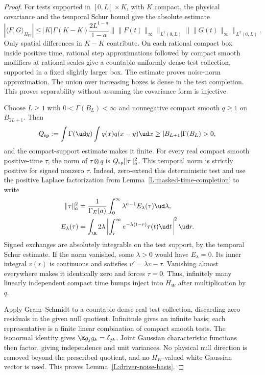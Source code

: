 \begin{proof}
  For tests supported in $[0,L]\times K$, with $K$ compact, the physical
  covariance and the temporal Schur bound give the absolute estimate
  \begin{equation}\label{E:driver-test-continuity}
    |\langle F,G\rangle_{H_W}|
    \le |K|\Gamma(K-K)\frac{2L^{1-a}}{1-a}
    \|\|F(t)\|_\infty\|_{L^2(0,L)}
    \|\|G(t)\|_\infty\|_{L^2(0,L)}.
  \end{equation}
  Only spatial differences in $K-K$ contribute. On each rational compact
  box inside positive time, rational step approximations followed by compact
  smooth mollifiers at rational scales give a countable uniformly dense
  test collection, supported in a fixed slightly larger box. The estimate
  proves noise-norm approximation. The union over increasing boxes is dense
  in the test completion. This proves separability without assuming the
  covariance form is injective.

  Choose $L\ge1$ with $0<\Gamma(B_L)<\infty$ and nonnegative compact
  smooth $q\ge1$ on $B_{2L+1}$. Then
  \[
    Q_{\rm sp}:=\int\Gamma(\ud y)\int q(x)q(x-y)\ud x
    \ge |B_{L+1}|\Gamma(B_L)>0,
  \]
  and the compact-support estimate makes it finite. For every real compact
  smooth positive-time $\tau$, the norm of $\tau\otimes q$ is
  $Q_{\rm sp}\|\tau\|_a^2$. This temporal norm is strictly positive for
  signed nonzero $\tau$. Indeed, zero-extend this deterministic test and
  use the positive Laplace factorization from
  Lemma~\ref{L:masked-time-completion} to write
  \begin{align*}
    \|\tau\|_a^2
    &=\frac1{\Gamma_E(a)}\int_0^\infty\lambda^{a-1}
    E_\lambda(\tau)\ud\lambda,\\
    E_\lambda(\tau)
    &=\int_\R 2\lambda\left|\int_r^\infty
    e^{-\lambda(t-r)}\tau(t)\ud t\right|^2\ud r.
  \end{align*}
  Signed exchanges are absolutely integrable on the test support, by the
  temporal Schur estimate. If the norm vanished, some $\lambda>0$ would
  have $E_\lambda=0$. Its inner integral $v(r)$ is continuous and satisfies
  $v'=\lambda v-\tau$. Vanishing almost everywhere makes it identically
  zero and forces $\tau=0$. Thus, infinitely many linearly independent
  compact time bumps inject into $H_W$ after multiplication by $q$.

  Apply Gram--Schmidt to a countable dense real test collection, discarding
  zero residuals in the given null quotient. Infinitude gives an infinite
  basis; each representative is a finite linear combination of compact
  smooth tests. The isonormal identity gives $\E g_jg_k=\delta_{jk}$.
  Joint Gaussian characteristic functions then factor, giving independence
  and unit variances. No physical null direction is removed beyond the
  prescribed quotient, and no $H_W$-valued white Gaussian vector is used.
  This proves Lemma~\ref{L:driver-noise-basis}.
\end{proof}

